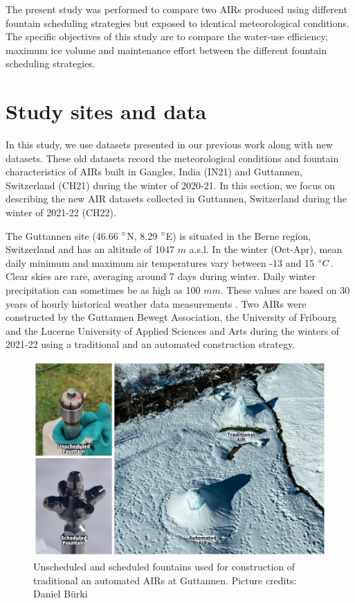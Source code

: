 \documentclass[tc, manuscript]{copernicus}
\begin{document}
The present study was performed to compare two AIRs produced using different fountain scheduling strategies but
exposed to identical meteorological conditions. The specific objectives of this study are to compare the
water-use efficiency, maximum ice volume and maintenance effort between the different fountain scheduling strategies.

\section{Study sites and data}

In this study, we use datasets presented in our previous work
\citep{balasubramanianInfluenceMeteorologicalConditions2022} along with new datasets. These old datasets record
the meteorological conditions and fountain characteristics of AIRs built in Gangles, India (IN21) and Guttannen,
Switzerland (CH21) during the winter of 2020-21. In this section, we focus on describing the new AIR datasets
collected in Guttannen, Switzerland during the winter of 2021-22 (CH22).

The Guttannen site (46.66 $^{\circ}$N, 8.29 $^{\circ}$E) is situated in the Berne region, Switzerland and has an
altitude of 1047 $m$ a.s.l. In the winter (Oct-Apr), mean daily minimum and maximum air temperatures vary
between -13 and 15 $^{\circ} C$. Clear skies are rare, averaging around 7 days during winter. Daily winter
precipitation can sometimes be as high as 100 $mm$. These values are based on 30 years of hourly historical
weather data measurements \citep{meteoblueClimateGuttannen2021}. Two AIRs were constructed by the Guttannen
Bewegt Association, the University of Fribourg and the Lucerne University of Applied Sciences and Arts during
the winters of 2021-22 using a traditional and an automated construction strategy.

\begin{figure}[t]
\includegraphics[width=12cm]{Figures/AIR_fountains.jpg}
\caption{Unscheduled and scheduled fountains used for construction of traditional an automated AIRs at Guttannen. Picture credits: Daniel Bürki}
\label{fig:2AIR}
\end{figure}
\end{document}
